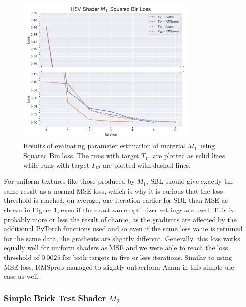 \begin{figure}
    \centering
    \includegraphics[width=0.8\textwidth]{img/evaluation/M1/HSV_SBL.pdf}
    \caption{Results of evaluating parameter estimation of material $M_1$ using Squared Bin loss. The runs with target $T_{11}$ are plotted as solid lines while runs with target $T_{12}$ are plotted with dashed lines.}
    \label{fig:M1SBLData}
\end{figure}

For uniform textures like those produced by $M_1$, SBL should give exactly the same result as a normal MSE loss, which is why it is curious that the loss threshold is reached, on average, one iteration earlier for SBL than MSE as shown in Figure \ref{fig:M1SBLData}, even if the exact same optimizer settings are used. This is probably more or less the result of chance, as the gradients are affected by the additional PyTorch functions used and so even if the same loss value is returned for the same data, the gradients are slightly different. Generally, this loss works equally well for uniform shaders as MSE and we were able to reach the loss threshold of $0.0025$ for both targets in five or less iterations. Similar to using MSE loss, RMSprop managed to slightly outperform Adam in this simple use case as well.

\subsubsection{Simple Brick Test Shader $M_2$}

